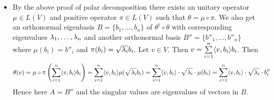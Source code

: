 \documentclass[a4paper, 11pt]{article}
\begin{document}
{\begin{itemize}[label=$\bullet$]
	Now we will show that $\mu$ is unitary and $\pi$ is positive. Now $\pi$ is diagonalizable with respect to an orthonormal eigen basis with all its eigenvalues are non-negative. Hence $\pi$ is positive. So only thing remains is to show that $\mu$ is unitary. Let for any $v\in V$, $v=\sum\limits_{i=1}^n a_ib_i$ where $a_i\in \bbC$. Then we have $$\lt\la \sum\limits_{i=1}^n a_ib_i,\sum\limits_{i=1}^n a_ib_i\rt\ra=\sum\limits_{i=1}^n |a_i|^2\la b_i,b_i\ra=\sum\limits_{i=1}^n |a_i|^2$$On the other hand we have $$\lt\la \mu\lt(\sum\limits_{i=1}^n a_ib_i\rt),\mu\lt(\sum\limits_{i=1}^n a_ib_i\rt)\rt\ra=\lt\la \sum\limits_{i=1}^n a_i\mu(b_i),\sum\limits_{i=1}^n a_i\mu(b_i)\rt\ra=\sum_{i=1}^n |a_i|^2\la b_i,b_i\ra=\sum_{i=1}^n |a_i|^2$$Hence $\mu$ is unitary. Therefore there exists an unitary operator $\mu\in L(V)$ and a positive operator $\pi\in L(V) $ such that $\theta=\mu\circ \pi$. 
	
	\item By the above proof of polar decomposition there exists an unitary operator $\mu\in L(V)$ and positive operator $\pi\in L(V)$ such that $\theta=\mu\circ \pi$. We also get an orthonormal eigenbasis $B=\{b_1,\dots, b_n\}$ of $\theta^{\dagger}\circ \theta$ with corresponding eigenvalues $\lambda_1,\dots, \lambda_n$ and another orthonormal basis $B''=\{b''_1,\dots, b''_n\}$ where $\mu(b_i)=b''_i$ and $\pi(b_i)=\sqrt{\lambda_i}b_i$. Let $v\in V$. Then $v=\sum\limits_{i=1}^n \langle v,b_i\rangle b_i$. Then $$\theta(v)=\mu\circ\pi\left(\sum\limits_{i=1}^n \langle v,b_i\rangle b_i\right)=\sum\limits_{i=1}^n \langle v,b_i\rangle \mu(\sqrt{\lambda_i}b_i)=\sum\limits_{i=1}^n \langle v,b_i\rangle\cdot\sqrt{\lambda_i}\cdot\mu(b_i)=\sum\limits_{i=1}^n \langle v,b_i\rangle\cdot\sqrt{\lambda_i} \cdot b''_i$$Hence here $A=B''$ and the singular values are eigenvalues of vectors in $B$.
\end{itemize}
}
\newpage
\end{document}
